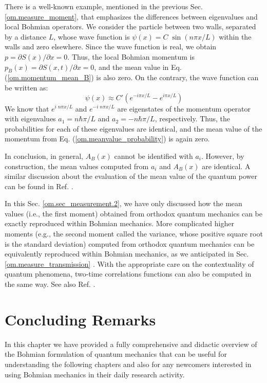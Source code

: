 \documentclass[nofootinbib, secnumarabic, amsmath, nobibnotes,11pt,aps,pra, floatfix]{revtex4-1}
\newcommand{\sref}[1]{Sec. \ref{#1}}
\newcommand{\eref}[1]{Eq. (\ref{#1})}
\begin{document}
There is a well-known example, mentioned in the previous
\sref{om.measure_moment}, that emphasizes the differences between
eigenvalues and local Bohmian operators. We consider the particle
between two walls, separated by a distance $L$, whose wave function
is $\psi(x) = C \; \sin(n\pi x/L)$ within the walls and zero
elsewhere. Since the wave function is real, we obtain $p = \partial
S(x)/\partial x = 0$. Thus, the local Bohmian momentum is $p_B(x) =
{\partial S(x,t)}/{\partial x} = 0$, and the mean value in
\eref{om.momentum_mean_B} is also zero. On the contrary, the wave
function can be written as:
\begin{equation}
\psi(x) \approx C' \left(e^{-i\pi x/L}-e^{i\pi x/L} \right)
\end{equation}
We know that $e^{i \; n \pi x/L}$ and $e^{-i \; n \pi x/L}$ are
eigenstates of the momentum operator with eigenvalues $a_1 = n \hbar
\pi/L$ and $a_2 = -n \hbar \pi/L$, respectively. Thus, the
probabilities for each of these eigenvalues are identical, and the
mean value of the momentum from \eref{om.meanvalue_probability} is
again zero.

In conclusion, in general, $A_B(x)$ cannot be identified with $a_i$.
However, by construction, the mean values computed from $a_i$ and
$A_B(x)$ are identical. A similar discussion about the evaluation of
the mean value of the  quantum power can be found in Ref.
\cite{om.quantumpower}.

In this \sref{om.sec_measurement.2}, we have only discussed how the
mean values (i.e., the first moment) obtained from orthodox quantum
mechanics can be exactly reproduced within Bohmian mechanics. More
complicated higher moments (e.g., the second moment called the
variance, whose positive square root is the standard deviation)
computed from orthodox quantum mechanics can be equivalently
reproduced within Bohmian mechanics, as we anticipated in
\sref{om.measure_transmission} \cite{om.Durrnaive,om.Durrllibre,
om.goldstein}. With the appropriate care on the contextuality of quantum phenomena,  two-time correlations functions can also be computed in the same way. See also Ref. \cite{om.Muga}.


\section{Concluding Remarks}

In this chapter we have provided a fully comprehensive and didactic overview of the Bohmian formulation of quantum mechanics that can be useful for understanding the following chapters and also for any newcomers interested in using Bohmian mechanics in their daily research activity.
\end{document}
